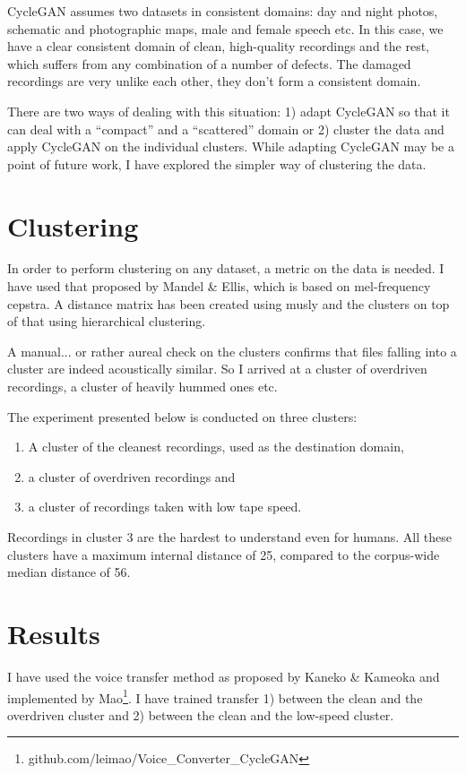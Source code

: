 \documentclass[hidelinks,12pt,a4paper]{report}
\begin{document}
CycleGAN assumes two datasets in consistent domains: day and night photos,
schematic and photographic maps, male and female speech etc. In this case,
we have a clear consistent domain of clean, high-quality recordings and the
rest, which suffers from any combination of a number of defects. The damaged
recordings are very unlike each other, they don't form a consistent domain.

There are two ways of dealing with this situation: 1) adapt CycleGAN so that it
can deal with a ``compact'' and a ``scattered'' domain or 2) cluster the
data and apply CycleGAN on the individual clusters. While adapting CycleGAN may be a
point of future work, I have explored the simpler way of clustering the data.

\section{Clustering}

In order to perform clustering on any dataset, a metric on the data is needed.
I have used that proposed by Mandel \& Ellis\cite{mandel2005song}, which
is based on mel-frequency cepstra. A distance matrix has been created using
musly\cite{schnitzer2011using} and the clusters on top of that using
hierarchical clustering\cite{johnson1967hierarchical}.

A manual... or rather aureal check on the clusters confirms that files falling
into a cluster are indeed acoustically similar. So I arrived at a cluster of
overdriven recordings, a cluster of heavily hummed ones etc.

The experiment presented below is conducted on three clusters:
\begin{enumerate}
\item{A cluster of the cleanest recordings, used as the destination domain,}
\item{a cluster of overdriven recordings and}
\item{a cluster of recordings taken with low tape speed.}
\end{enumerate}
Recordings in cluster 3 are the hardest to understand even for humans. All these
clusters have a maximum internal distance of 25, compared to the corpus-wide
median distance of 56.

\section{Results}

I have used the voice transfer method as proposed by Kaneko \&
Kameoka\cite{kaneko2017parallel} and implemented by
Mao\footnote{github.com/leimao/Voice\_Converter\_CycleGAN}. I have trained
transfer 1) between the clean and the overdriven cluster and 2) between the
clean and the low-speed cluster.
\end{document}
